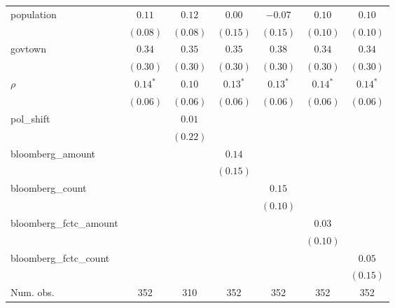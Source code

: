 \begin{table}[!h]
\begin{center}
\begin{tabular}{l c c c c c c }
population              & $0.11$       & $0.12$       & $0.00$       & $-0.07$      & $0.10$       & $0.10$       \\
                        & $(0.08)$     & $(0.08)$     & $(0.15)$     & $(0.15)$     & $(0.10)$     & $(0.10)$     \\
govtown                 & $0.34$       & $0.35$       & $0.35$       & $0.38$       & $0.34$       & $0.34$       \\
                        & $(0.30)$     & $(0.30)$     & $(0.30)$     & $(0.30)$     & $(0.30)$     & $(0.30)$     \\
$\rho$                  & $0.14^{*}$   & $0.10$       & $0.13^{*}$   & $0.13^{*}$   & $0.14^{*}$   & $0.14^{*}$   \\
                        & $(0.06)$     & $(0.06)$     & $(0.06)$     & $(0.06)$     & $(0.06)$     & $(0.06)$     \\
pol\_shift              &              & $0.01$       &              &              &              &              \\
                        &              & $(0.22)$     &              &              &              &              \\
bloomberg\_amount       &              &              & $0.14$       &              &              &              \\
                        &              &              & $(0.15)$     &              &              &              \\
bloomberg\_count        &              &              &              & $0.15$       &              &              \\
                        &              &              &              & $(0.10)$     &              &              \\
bloomberg\_fctc\_amount &              &              &              &              & $0.03$       &              \\
                        &              &              &              &              & $(0.10)$     &              \\
bloomberg\_fctc\_count  &              &              &              &              &              & $0.05$       \\
                        &              &              &              &              &              & $(0.15)$     \\
\midrule
Num. obs.               & 352          & 310          & 352          & 352          & 352          & 352          \\

\end{tabular}
\end{center}
\end{table}
